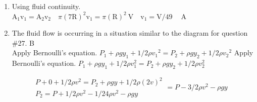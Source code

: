 \begin{enumerate}
\begin{enumerate}
  \item Using fluid continuity. $\mathrm{A}_{1} \mathrm{v}_{1}=\mathrm{A}_{2} \mathrm{v}_{2} \quad \pi(7 \mathrm{R})^{2} \mathrm{v}_{1}=\pi(\mathrm{R})^{2} \mathrm{~V} \quad \mathrm{v}_{1}=\mathrm{V} / 49 \quad \mathrm{~A}$
  \item The fluid flow is occurring in a situation similar to the diagram for question \#27. B\\
Apply Bernoulli's equation. $P_{1}+\rho g y_{1}+1 / 2 \rho v_{1}{ }^{2}=P_{2}+\rho g y_{2}+1 / 2 \rho v_{2}{ }^{2}$ Apply Bernoulli's equation. $P_{1}+\rho g y_{1}+1 / 2 \rho v_{1}^{2}=P_{2}+\rho g y_{2}+1 / 2 \rho v_{2}^{2}$
\end{enumerate}

$$
\begin{aligned}
& P+0+1 / 2 \rho v^{2}=P_{2}+\rho g y+1 / 2 \rho(2 v)^{2} \\
& P_{2}=P+1 / 2 \rho v^{2}-1 / 24 \rho v^{2}-\rho g y
\end{aligned}=P-3 / 2 \rho v^{2}-\rho g y
$$


\end{enumerate}
